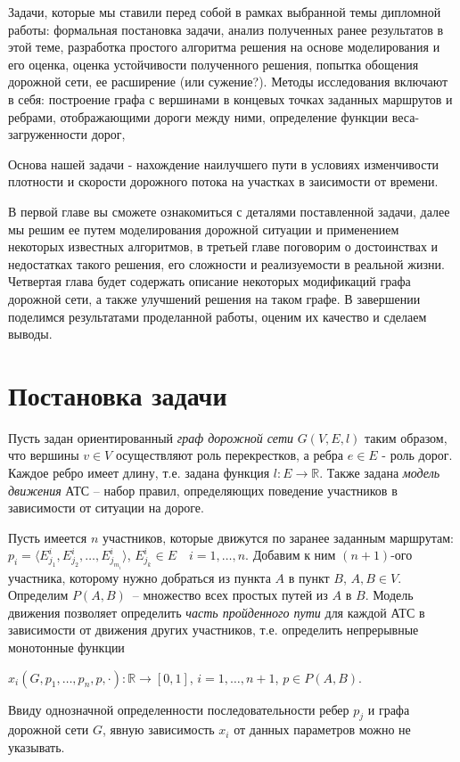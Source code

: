 \documentclass[12pt, a4paper]{article}
\begin{document}
Задачи, которые мы ставили перед собой в рамках выбранной темы дипломной работы: формальная постановка задачи, анализ полученных ранее результатов в этой теме, разработка простого алгоритма решения на основе моделирования и его оценка, оценка устойчивости полученного решения, попытка обощения дорожной сети, ее расширение (или сужение?). Методы исследования включают в себя: построение графа с вершинами в концевых точках заданных маршрутов и ребрами, отображающими дороги между ними, определение функции веса-загруженности дорог, 



Основа нашей задачи - нахождение наилучшего пути в условиях изменчивости плотности и скорости дорожного потока на участках в заисимости от времени.

В первой главе вы сможете ознакомиться с деталями поставленной задачи, далее мы решим ее путем моделирования дорожной ситуации и применением некоторых известных алгоритмов, в третьей главе поговорим о достоинствах и недостатках такого решения, его сложности и реализуемости в реальной жизни. Четвертая глава будет содержать описание некоторых модификаций графа дорожной сети, а также улучшений решения на таком графе. В завершении поделимся результатами проделанной работы, оценим их качество и сделаем выводы.




\newpage
\section{Постановка задачи}
Пусть задан ориентированный \textit{граф дорожной сети} $ G (V, E, l)$ таким образом, что вершины $ v \in V$ осуществляют роль перекрестков, а ребра $e \in E$ - роль дорог. Каждое ребро имеет длину, т.е. задана функция $l : E \rightarrow \mathbb {R} $. Также задана \textit{модель движения} АТС -- набор правил, определяющих поведение участников в зависимости от ситуации на дороге.

Пусть имеется $n$ участников, которые движутся по заранее заданным маршрутам:  $ p_i = \langle E^i_{j_1}, E^i_{j_2}, \dots, E^i_{j_{m_i}} \rangle$, $ E^i_{j_k} \in E \quad i = 1, \dots, n$. Добавим к ним $(n+1)$-ого участника, которому нужно добраться из пункта $A$ в пункт $B$, $A, B \in V$. Определим $P(A,B)$~-- множество всех простых путей из $A$ в $B$. Модель движения позволяет определить \textit{часть пройденного пути} для каждой АТС в зависимости от движения других участников, т.е. определить непрерывные монотонные функции
\begin{center}
 $x_i(G, p_1, \dots, p_n, p, \cdot ) : \mathbb {R} \rightarrow [0 , 1] $, $i = 1, \dots, n+1$, $p \in P(A, B) $.
\end{center}
Ввиду однозначной определенности последовательности ребер $p_j$ и графа дорожной сети $G$, явную зависимость $x_i$ от данных параметров можно не указывать.
\end{document}
